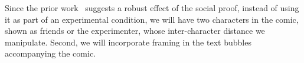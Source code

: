 


Since the prior work~\cite{goldstein2008room,schultz2007constructive} suggests a robust effect of the social proof, instead of using it as part of an experimental condition, we will have two characters in the comic, shown as friends or the experimenter, whose inter-character distance we manipulate. Second, we will incorporate framing in the text bubbles accompanying the comic.
